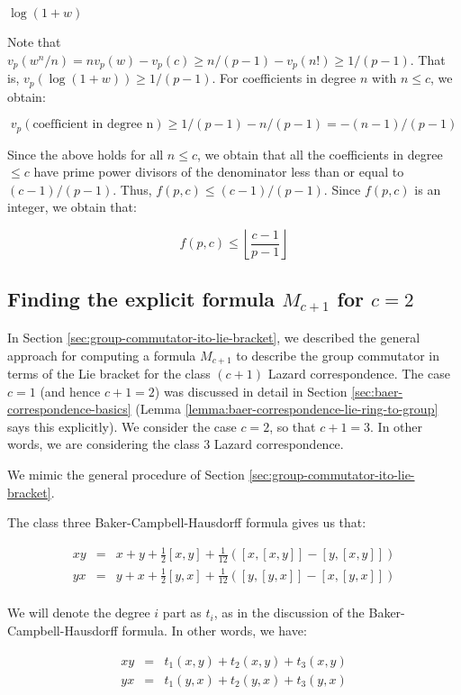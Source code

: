 $\! \log(1 + w)$

Note that $v_p(w^n/n)=nv_p(w)-v_p(c)\geq n/(p-1) - v_p(n!) \geq
1/(p-1)$. That is, $v_p(\log(1 + w))\geq 1/(p-1)$. For coefficients in
degree $n$ with $n \le c$, we obtain:

$$v_p(\mbox{coefficient in degree n}) \geq 1/(p-1) - n/(p-1)=-(n-1)/(p-1)$$

Since the above holds for all $n \le c$, we obtain that all the
coefficients in degree $\le c$ have prime power divisors of the
denominator less than or equal to $(c - 1)/(p - 1)$. Thus, $f(p,c) \le
(c - 1)/(p - 1)$. Since $f(p,c)$ is an integer, we obtain that:

$$f(p,c) \le \left \lfloor \frac{c - 1}{p - 1}\right \rfloor$$

\subsection{Finding the explicit formula $M_{c+1}$ for $c = 2$}\label{appsec:M3formula}

In Section \ref{sec:group-commutator-ito-lie-bracket}, we described
the general approach for computing a formula $M_{c+1}$ to describe the
group commutator in terms of the Lie bracket for the class $(c + 1)$
Lazard correspondence. The case $c = 1$ (and hence $c + 1 = 2$) was
discussed in detail in Section \ref{sec:baer-correspondence-basics}
(Lemma \ref{lemma:baer-correspondence-lie-ring-to-group} says this
explicitly). We consider the case $c = 2$, so that $c + 1 = 3$. In
other words, we are considering the class $3$ Lazard correspondence.

We mimic the general procedure of Section
\ref{sec:group-commutator-ito-lie-bracket}.

The class three Baker-Campbell-Hausdorff formula gives us that:

\begin{eqnarray*}
  xy & = & x + y + \frac{1}{2}[x,y] + \frac{1}{12}([x,[x,y]] - [y,[x,y]])\\
  yx & = & y + x + \frac{1}{2}[y,x] + \frac{1}{12}([y,[y,x]] - [x,[y,x]])\\
\end{eqnarray*}

We will denote the degree $i$ part as $t_i$, as in the discussion of
the Baker-Campbell-Hausdorff formula. In other words, we have:

\begin{eqnarray*}
  xy & = & t_1(x,y) + t_2(x,y) + t_3(x,y)\\
  yx & = & t_1(y,x) + t_2(y,x) + t_3(y,x)\\
\end{eqnarray*}

